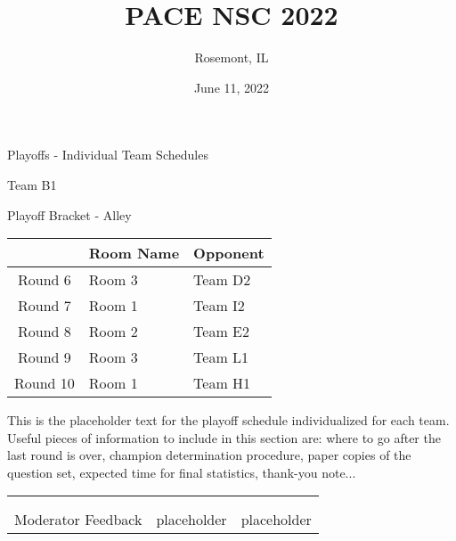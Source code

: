 \documentclass{article}%
\title{PACE NSC 2022}%
\author{Rosemont, IL}%
\date{June 11, 2022}%
\begin{document}
%
\normalsize%
%
\maketitle%
\vspace*{48pt}%
\begin{center}%
\begin{Huge}%
Playoffs {-} Individual Team Schedules%
\end{Huge}%
\end{center}%
\newpage%
\pagestyle{fancy}%
\fancyhf{}%
%
%
%
\begin{center}%
\begin{Huge}%
Team B1%
\end{Huge}%
\vspace*{12pt}%
\linebreak%
\begin{Large}%
Playoff Bracket {-} Alley%
\end{Large}%
\end{center}%
\vspace*{4pt}%
%
\begin{tabularx}{\textwidth}{|c|Y|Y|}%
\hline%
&Room Name&Opponent\\%
\hline%
Round 6&Room 3&Team D2\\%
Round 7&Room 1&Team I2\\%
Round 8&Room 2&Team E2\\%
Round 9&Room 3&Team L1\\%
Round 10&Room 1&Team H1\\%
\hline%
\end{tabularx}%
\vspace*{30pt}%
\linebreak%
This is the placeholder text for the playoff schedule individualized for each team. Useful pieces of information to include in this section are: where to go after the last round is over, champion determination procedure, paper copies of the question set, expected time for final statistics, thank{-}you note...%
\vspace*{30pt}%
\newline%
%
\begin{tabularx}{\textwidth}{YYY}%
  &  &  \\%
\\%
Moderator Feedback&placeholder&placeholder\\%
\end{tabularx}%
\end{document}
